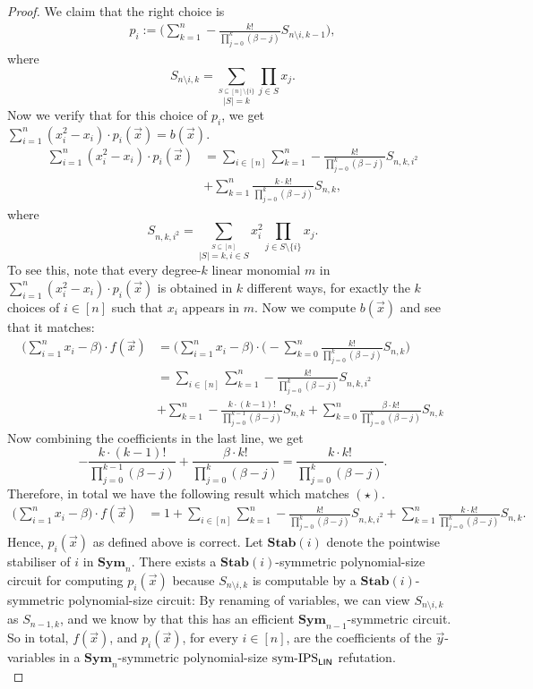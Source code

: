 \documentclass[10pt,a4paper]{article}
\newcommand{\Sym}{{\mathbf{Sym}}}
\newcommand{\Stab}{\mathbf{Stab}}
\newcommand{\symIPSlin}{\text{ \upshape sym-IPS}_{\mathsf{LIN}}}
\begin{document}
\begin{proof}
	We claim that the right choice is
	\begin{align*}
		p_i :=  \Big(\sum_{k=1}^n -\frac{k!}{\prod_{j = 0}^k (\beta - j)} S_{n \setminus i,k-1} \Big),
	\end{align*}	
	where \[
	S_{n \setminus i,k} = \sum_{\stackrel{S \subseteq [n] \setminus \{i\}}{|S| = k}} \prod_{j \in S} x_j.
	\]
	Now we verify that for this choice of $p_i$, we get $\sum_{i=1}^n (x_i^2 -x_i) \cdot p_i(\vec x) = b(\vec x)$.
	\begin{align*}
		\sum_{i=1}^n (x_i^2 -x_i) \cdot p_i(\vec x) &= \sum_{i \in [n]}\sum_{k=1}^n - \frac{k!}{\prod_{j = 0}^k (\beta - j)} S_{n,k,i^2}\\
		&+ \sum_{k=1}^n \frac{k \cdot k!}{\prod_{j = 0}^k (\beta - j)} S_{n,k}, \tag{$\star$}
	\end{align*}	
	where 
	\[
	S_{n,k,i^2} = \sum_{\stackrel{S \subseteq [n]}{|S| = k, i \in S}} x_i^2 \prod_{j \in S \setminus \{i\}} x_j.
	\]
	To see this, note that every degree-$k$ linear monomial $m$ in $\sum_{i=1}^n (x_i^2 -x_i) \cdot p_i(\vec x)$ is obtained in $k$ different ways, for exactly the $k$ choices of $i \in [n]$ such that $x_i$ appears in $m$. Now we compute $b(\vec x)$ and see that it matches:
	\begin{align*}
		\Big(\sum_{i=1}^n x_i - \beta \Big) \cdot f(\vec x) &=  \Big(\sum_{i=1}^n x_i - \beta \Big) \cdot \Big(- \sum_{k=0}^n \frac{k!}{\prod_{j=0}^k (\beta -j)} S_{n,k}\Big)\\	 
		&= \sum_{i \in [n]}\sum_{k=1}^n - \frac{k!}{\prod_{j = 0}^k (\beta - j)} S_{n,k,i^2}\\
		&+ \sum_{k=1}^{n} -\frac{k \cdot (k-1)!}{\prod_{j = 0}^{k-1} (\beta - j)} S_{n,k} + \sum_{k=0}^n \frac{\beta \cdot k!}{\prod_{j = 0}^{k} (\beta - j)} S_{n,k} 
	\end{align*}	
	Now combining the coefficients in the last line, we get
	\[
	-\frac{k \cdot (k-1)!}{\prod_{j = 0}^{k-1} (\beta - j)} + \frac{\beta \cdot k!}{\prod_{j = 0}^{k} (\beta - j)}  =  \frac{k \cdot k!}{\prod_{j = 0}^k (\beta - j)}. 
	\]
	Therefore, in total we have the following result which matches $(\star)$.
	\begin{align*}
		\Big(\sum_{i=1}^n x_i - \beta \Big) \cdot f(\vec x) &= 1+ \sum_{i \in [n]}\sum_{k=1}^n - \frac{k!}{\prod_{j = 0}^k (\beta - j)} S_{n,k,i^2} + \sum_{k=1}^n \frac{k \cdot k!}{\prod_{j = 0}^k (\beta - j)} S_{n,k}.
	\end{align*}	
	Hence, $p_i(\vec x)$ as defined above is correct. Let $\Stab(i)$ denote the pointwise stabiliser of $i$ in $\Sym_n$. There exists a $\Stab(i)$-symmetric polynomial-size circuit for computing $p_i(\vec x)$ because $S_{n \setminus i,k}$ is computable by a $\Stab(i)$-symmetric polynomial-size circuit: By renaming of variables, we can view $S_{n \setminus i,k}$ as $S_{n-1,k}$, and we know by \cite{shpilka2001depth} that this has an efficient $\Sym_{n-1}$-symmetric circuit. So in total, $f(\vec x)$, and $p_i(\vec x)$, for every $i \in [n]$, are the coefficients of the $\vec y$-variables in a $\Sym_n$-symmetric polynomial-size$\symIPSlin{}$ refutation.\\
	

\end{proof}
\end{document}
